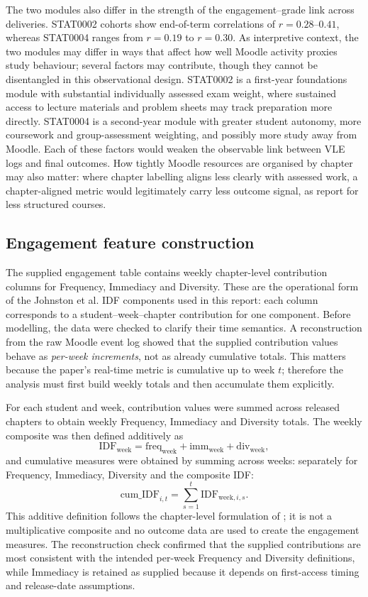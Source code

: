 \documentclass[11pt,a4paper]{article}
\begin{document}
The two modules also differ in the strength of the engagement--grade link across
deliveries. STAT0002 cohorts show end-of-term correlations of $r=0.28$--$0.41$,
whereas STAT0004 ranges from $r=0.19$ to $r=0.30$. As interpretive context, the
two modules may differ in ways that affect how well Moodle activity proxies study
behaviour; several factors may contribute, though they cannot be disentangled in
this observational design. STAT0002 is a first-year foundations module with
substantial individually assessed exam weight, where sustained access to lecture
materials and problem sheets may track preparation more directly. STAT0004 is a
second-year module with greater student autonomy, more coursework and
group-assessment weighting, and possibly more study away from Moodle. Each of
these factors would weaken the observable link between VLE logs and final outcomes. How
tightly Moodle resources are organised by chapter may also matter: where chapter
labelling aligns less clearly with assessed work, a chapter-aligned metric would
legitimately carry less outcome signal, as \citet{johnston2025} report for less
structured courses.

\subsection{Engagement feature construction}
The supplied engagement table contains weekly chapter-level contribution columns
for Frequency, Immediacy and Diversity. These are the operational form of the
Johnston et al. IDF components used in this report: each column corresponds to a
student--week--chapter contribution for one component. Before modelling, the
data were checked to clarify their time semantics. A reconstruction from the raw
Moodle event log showed that the supplied contribution values behave as
\emph{per-week increments}, not as already cumulative totals. This matters
because the paper's real-time metric is cumulative up to week $t$; therefore the
analysis must first build weekly totals and then accumulate them explicitly.

For each student and week, contribution values were summed across released
chapters to obtain weekly Frequency, Immediacy and Diversity totals. The weekly
composite was then defined additively as
\[
\mathrm{IDF}_\mathrm{week} = \mathrm{freq}_\mathrm{week} +
\mathrm{imm}_\mathrm{week} + \mathrm{div}_\mathrm{week},
\]
and cumulative measures were obtained by summing across weeks:
separately for Frequency, Immediacy, Diversity and the composite IDF:
\[
  \mathrm{cum\_IDF}_{i,t} = \sum_{s=1}^{t}\mathrm{IDF}_{\mathrm{week},i,s}.
\]
This
additive definition follows the chapter-level formulation of
\citet{johnston2025}; it is not a multiplicative composite and no outcome data
are used to create the engagement measures. The reconstruction check confirmed
that the supplied contributions are most consistent with the intended per-week
Frequency and Diversity definitions, while Immediacy is retained as supplied
because it depends on first-access timing and release-date assumptions.
\end{document}

